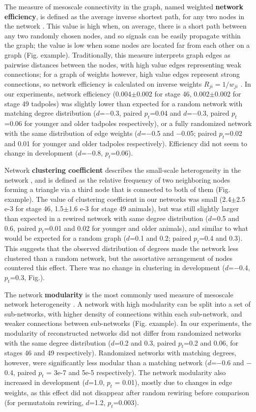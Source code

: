 \documentclass{article}
\begin{document}
The measure of mesoscale connectivity in the graph, named weighted \textbf{network efficiency}, is defined as the average inverse shortest path, for any two nodes in the network \citep{rubinov2010toolbox,latora2001efficiency}. This value is high when, on average, there is a short path between any two randomly chosen nodes, and so signals can be easily propagate within the graph; the value is low when some nodes are located far from each other on a graph (Fig. example). Traditionally, this measure interprets graph edges as pairwise distances between the nodes, with high value edges representing weak connections; for a graph of weights however, high value edges represent strong connections, so network efficiency is calculated on inverse weights $R_{ji} = 1/w_{ji}$ \citep{rubinov2010toolbox}. In our experiments, network efficiency (0.004$\pm$0.002 for stage 46, 0.002$\pm$0.002 for stage 49 tadpoles) was slightly lower than expected for a random network with matching degree distribution ($d$=$-$0.3, paired $p_t$=0.04 and $d$=$-$0.3, paired $p_t$=0.06 for younger and older tadpoles respectively), or a fully randomized network with the same distribution of edge weights ($d$=$-$0.5 and $-$0.05; paired $p_t$=0.02 and 0.01 for younger and older tadpoles respectively). Efficiency did not seem to change in development ($d$=$-$0.8, $p_t$=0.06).

Network \textbf{clustering coefficient} describes the small-scale heterogeneity in the network \citep{fagiolo2007}, and is defined as the relative frequency of two neighboring nodes forming a triangle via a third node that is connected to both of them (Fig. example). The value of clustering coefficient in our networks was small (2.4$\pm$2.5 e-3 for stage 46, 1.5$\pm$1.6 e-3 for stage 49 animals), but was still slightly larger than expected in a rewired network with same degree distribution ($d$=0.5 and 0.6, paired $p_t$=0.01 and 0.02 for younger and older animals), and similar to what would be expected for a random graph ($d$=0.1 and 0.2; paired $p_t$=0.4 and 0.3). This suggests that the observed distribution of degrees made the network less clustered than a random network, but the assortative arrangement of nodes countered this effect. There was no change in clustering in development ($d$=$-$0.4, $p_t$=0.3, Fig.).

The network \textbf{modularity} is the most commonly used measure of mesoscale network heterogeneity \citep{leicht2008community,newman2006modularity}. A network with high modularity can be split into a set of sub-networks, with higher density of connections within each sub-network, and weaker connections between sub-networks (Fig. example). In our experiments, the modularity of reconstructed networks did not differ from randomized networks with the same degree distribution ($d$=0.2 and 0.3, paired $p_t$=0.2 and 0.06, for stages 46 and 49 respectively). Randomized networks with matching degrees, however, were significantly less modular than a matching network ($d$=$-$0.6 and $-$0.4, paired $p_t$ = 3e-7 and 5e-5 respectively). The network modularity also increased in development ($d$=1.0, $p_t$ = 0.01), mostly due to changes in edge weights, as this effect did not disappear after random rewiring before comparison (for permutatoin rewiring, $d$=1.2, $p_t$=0.003).
\end{document}
